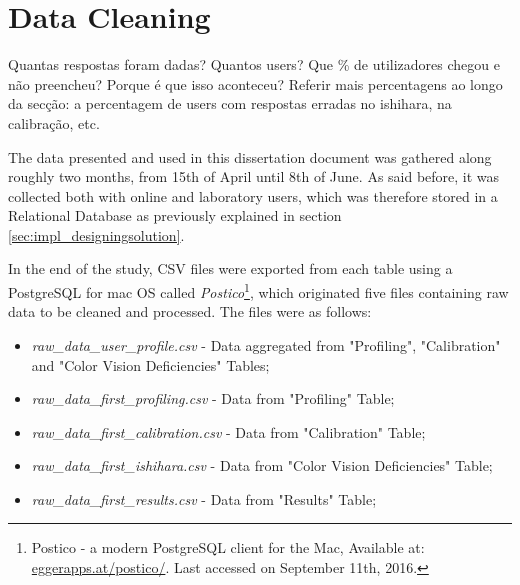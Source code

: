 \section{Data Cleaning}
\label{sec:results_datacleaning}
%
Quantas respostas foram dadas? Quantos users? Que \% de utilizadores chegou e não preencheu? Porque é que isso aconteceu? Referir mais percentagens ao longo
da secção: a percentagem de users com respostas erradas no ishihara, na calibração, etc. \par 
%
The data presented and used in this dissertation document was gathered along roughly two months, from 15th of April until 8th of June. As said before,
it was collected both with online and laboratory users, which was therefore stored in a Relational Database as previously explained in section
\ref{sec:impl_designingsolution}. \par
%
In the end of the study, \gls{CSV} files were exported from each table using a PostgreSQL for mac OS called
\emph{Postico}\footnote{Postico - a modern PostgreSQL client for the Mac, Available at: \url{eggerapps.at/postico/}. Last accessed on
September 11th, 2016.}, which originated five files containing raw data to be cleaned and processed. The files were as follows:
%
\begin{itemize}
  \item \emph{raw\_data\_user\_profile.csv} - Data aggregated from "Profiling", "Calibration" and "Color Vision Deficiencies" Tables;
  \item \emph{raw\_data\_first\_profiling.csv} - Data from "Profiling" Table;
  \item \emph{raw\_data\_first\_calibration.csv} - Data from "Calibration" Table;
  \item \emph{raw\_data\_first\_ishihara.csv} - Data from "Color Vision Deficiencies" Table;
  \item \emph{raw\_data\_first\_results.csv} - Data from "Results" Table;
\end{itemize} \par
%
